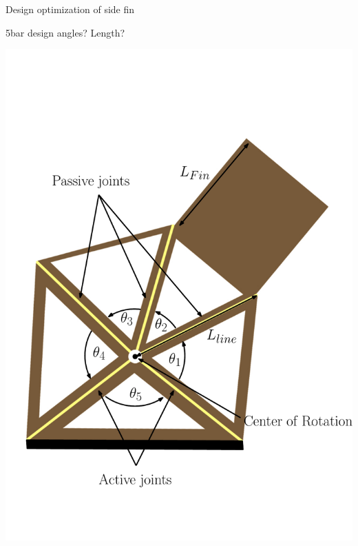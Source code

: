 \documentclass[aspectratio=169, xcolor=table]{beamer}
\begin{document}
\begin{frame}{Design optimization of side fin}
\begin{block}{5bar design angles? \qquad \qquad Length?}
\begin{center}
\includegraphics[scale=0.27]{5bar_Fin.pdf}
\end{center}
\end{block}
\end{frame}
\end{document}

